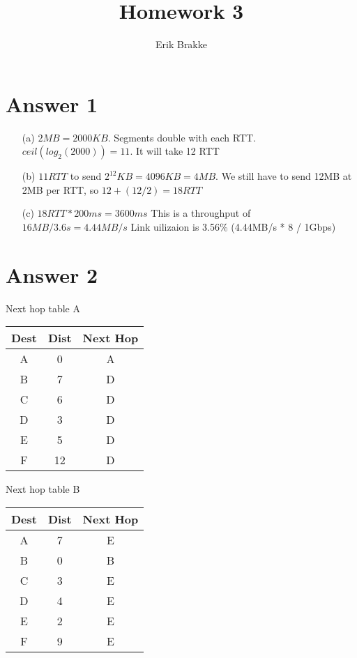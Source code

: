 \documentclass[11pt]{article}
\theoremstyle{definition}
\begin{document}
\title{Homework 3}
\author{Erik Brakke}
\maketitle

\thispagestyle{fancy}


\section*{Answer 1}
\begin{enumerate}
	\item[(a)] $2MB = 2000KB$.  Segments double with each RTT.  $ceil(log_2(2000)) = 11$. It will take 12 RTT

	\item[(b)] $11 RTT$ to send $2^12KB = 4096KB = 4MB$.  We still have to send 12MB at 2MB per RTT, so $12 + (12/2) = 18RTT$

	\item[(c)] $18 RTT * 200ms = 3600ms$  This is a throughput of $16MB / 3.6s = 4.44MB/s$  Link uilizaion is 3.56\% (4.44MB/s * 8 / 1Gbps) 
\end{enumerate}

\section*{Answer 2}
Next hop table A\\
\begin{tabular}{|c|c|c|}
\hline
Dest & Dist & Next Hop\\
\hline
A & 0 & A\\
B & 7 & D\\
C & 6 & D\\
D & 3 & D\\
E & 5 & D\\
F & 12 & D\\
\hline
\end{tabular}

Next hop table B\\
\begin{tabular}{|c|c|c|}
\hline
Dest & Dist & Next Hop\\
\hline
A & 7 & E\\
B & 0 & B\\
C & 3 & E\\
D & 4 & E\\
E & 2 & E\\
F & 9 & E\\
\hline
\end{tabular}
\end{document}

